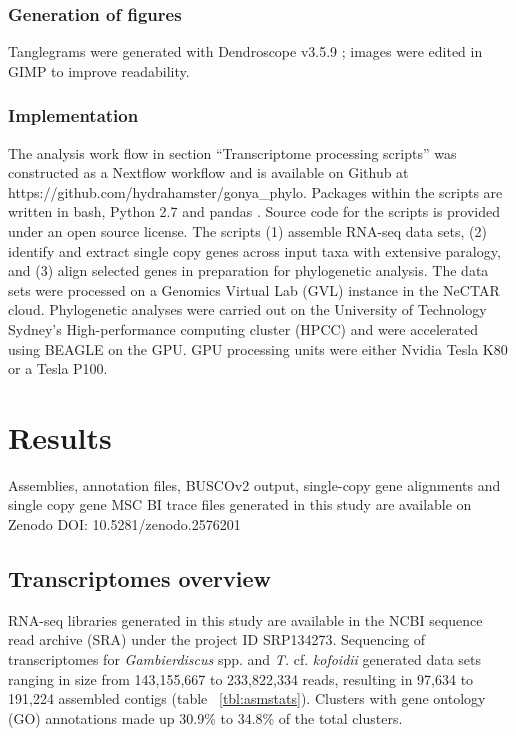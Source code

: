 \documentclass[fleqn,10pt,lineno]{wlpeerj} %
\begin{document}
\subsubsection*{Generation of figures}
Tanglegrams were generated with Dendroscope v3.5.9 \citep{huson2007dendroscope}; images were edited in GIMP \citep{gimp2008image} to improve readability.

\subsubsection*{Implementation}
The analysis work flow in section ``Transcriptome processing scripts'' was constructed as a Nextflow workflow \citep{di2017nextflow} and is available on Github at https://github.com/hydrahamster/gonya\_phylo. 
Packages within the scripts are written in bash, Python 2.7 \citep{stevens2018python} and pandas \citep{pandas}. 
Source code for the scripts is provided under an open source license.
The scripts (1) assemble RNA-seq data sets, (2) identify and extract single copy genes across input taxa with extensive paralogy, and (3) align selected genes in preparation for phylogenetic analysis.
The data sets were processed on a Genomics Virtual Lab (GVL) \citep{afgan2015genomics} instance in the NeCTAR cloud.
Phylogenetic analyses were carried out on the University of Technology Sydney's High-performance computing cluster (HPCC) and were accelerated using BEAGLE \citep{ayres2011beagle} on the GPU.
GPU processing units were either Nvidia Tesla K80 or a Tesla P100.

\section*{Results}
Assemblies, annotation files, BUSCOv2 output, single-copy gene alignments and single copy gene MSC BI trace files generated in this study are available on Zenodo DOI: 10.5281/zenodo.2576201

\subsection*{Transcriptomes overview}
RNA-seq libraries generated in this study are available in the NCBI sequence read archive (SRA) under the project ID SRP134273.
Sequencing of transcriptomes for \emph{Gambierdiscus} spp. and \emph{T.} cf. \emph{kofoidii} generated data sets ranging in size from 143,155,667 to 233,822,334 reads, resulting in 97,634 to 191,224 assembled contigs (table ~\ref{tbl:asmstats}). 
Clusters with gene ontology (GO) annotations made up 30.9\% to 34.8\% of the total clusters. 
\end{document}
